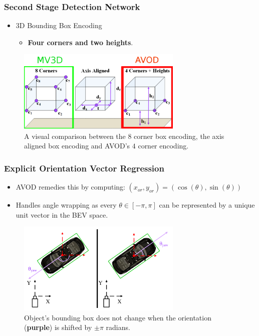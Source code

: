 \documentclass[10pt,fleqn,unknownkeysallowed]{beamer}
\begin{document}
\begin{frame}
	\frametitle{Second Stage Detection Network}
	\begin{itemize}
		\item{3D Bounding Box Encoding}
		\begin{itemize}
			\item{\textbf{Four corners and two heights}.}
		\end{itemize}
	\end{itemize}
	\begin{figure}[h] 
		\begin{center}
			\includegraphics[width=0.7\textwidth]{images/box_encodings.png}
		\end{center}
		\caption{A visual comparison between the $8$ corner box encoding, the axis aligned box encoding and AVOD's $4$ corner encoding.}
		\label{encoding}
	\end{figure}
\end{frame}

\begin{frame}
	\frametitle{Explicit Orientation Vector Regression}
	\begin{itemize}
		\item{AVOD remedies this by computing: $(x_{or}, y_{or})= (\cos(\theta),\sin(\theta))$}
		\item{Handles angle wrapping as every $\theta \in [-\pi, \pi]$ can be represented
			by a unique unit vector in the BEV space.}
	\end{itemize}
	\begin{figure}
		\begin{center}
			\includegraphics[width=0.7\textwidth]{images/pdfs/Metric.pdf}	
			\caption{Object's bounding box does not change when the orientation (\textbf{purple}) is shifted by $\pm \pi$ radians.}
		\end{center}
	\end{figure}
\end{frame}
\end{document}
